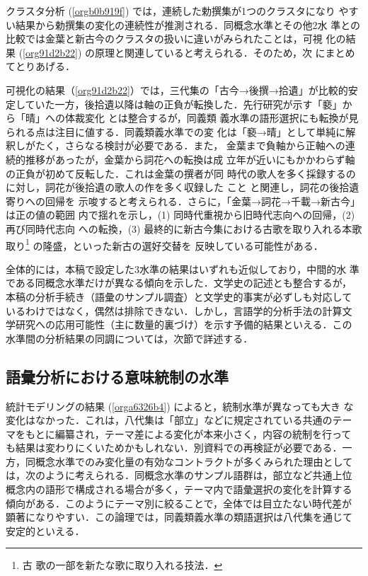 \documentclass[submit]{ipsj}
\renewcommand{\ref}{\cref}
\begin{document}
クラスタ分析 (\ref{orgb0b919f}) では，連続した勅撰集が1つのクラスタになり
やすい結果から勅撰集の変化の連続性が推測される．同概念水準とその他2水
準との比較では金葉と新古今のクラスタの扱いに違いがみられたことは，可視
化の結果 (\ref{org91d2b22}) の原理と関連していると考えられる．そのため，次
にまとめてとりあげる．

可視化の結果（\ref{org91d2b22}）では，三代集の「古今→後撰→拾遺」が比較的安
定していた一方，後拾遺以降は軸の正負が転換した．先行研究が示す「褻」か
ら「晴」への体裁変化 \cite{ueno1976Koshui} とは整合するが，同義類
義水準の語形選択にも転換が見られる点は注目に値する．同義類義水準での変
化は「褻→晴」として単純に解釈しがたく，さらなる検討が必要である．また，
金葉まで負軸から正軸への連続的推移があったが，金葉から詞花への転換は成
立年が近いにもかかわらず軸の正負が初めて反転した．これは金葉の撰者が同
時代の歌人を多く採録するのに対し，詞花が後拾遺の歌人の作を多く収録した
こと \cite{matsuda1939Shika} と関連し，詞花の後拾遺寄りへの回帰を
示唆すると考えられる．さらに，「金葉→詞花→千載→新古今」は正の値の範囲
内で揺れを示し，(1) 同時代重視から旧時代志向への回帰，(2) 再び同時代志向
への転換，(3) 最終的に新古今集における古歌を取り入れる本歌取り\footnote{古
歌の一部を新たな歌に取り入れる技法．} の隆盛，といった新古の選好交替を
反映している可能性がある．

全体的には，本稿で設定した3水準の結果はいずれも近似しており，中間的水
準である同概念水準だけが異なる傾向を示した．文学史の記述とも整合するが，
本稿の分析手続き（語彙のサンプル調査）と文学史的事実が必ずしも対応して
いるわけではなく，偶然は排除できない．しかし，言語学的分析手法の計算文
学研究への応用可能性（主に数量的裏づけ）を示す予備的結果といえる．この
水準間の分析結果の同調については，次節で詳述する．
\subsection{語彙分析における意味統制の水準\label{orged3e87f}}
\label{sec:org598bd5b}
統計モデリングの結果 (\ref{orga6326b4}) によると，統制水準が異なっても大き
な変化はなかった．これは，八代集は「部立」などに規定されている共通のテー
マをもとに編纂され，テーマ差による変化が本来小さく，内容の統制を行って
も結果は変わりにくいためかもしれない．別資料での再検証が必要である．一
方，同概念水準でのみ変化量の有効なコントラクトが多くみられた理由として
は，次のように考えられる．同概念水準のサンプル語群は，部立など共通上位
概念内の語形で構成される場合が多く，テーマ内で語彙選択の変化を計算する
傾向がある．このようにテーマ別に絞ることで，全体では目立たない時代差が
顕著になりやすい．この論理では，同義類義水準の類語選択は八代集を通じて
安定的といえる．
\end{document}
